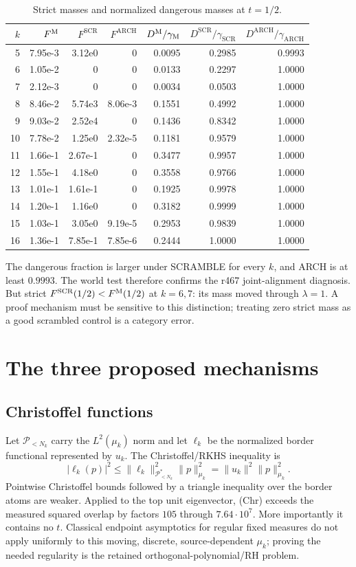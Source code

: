 \documentclass[11pt]{article}
\theoremstyle{remark}
\newcommand{\scr}{\mathrm{SCR}}
\newcommand{\arch}{\mathrm{ARCH}}
\begin{document}
\begin{table}[ht]
\centering\small
\caption{Strict masses and normalized dangerous masses at $t=1/2$.}
\label{tab:world}
\begin{tabular}{@{}rrrrrrr@{}}
\toprule
$k$&$F^{\rm M}$&$F^\scr$&$F^\arch$&
$D^{\rm M}/\gamma_{\rm M}$&$D^\scr/\gamma_\scr$&
$D^\arch/\gamma_\arch$\\
\midrule
5 &7.95e-3&3.12e0&0&0.0095&0.2985&0.9993\\
6 &1.05e-2&0&0&0.0133&0.2297&1.0000\\
7 &2.12e-3&0&0&0.0034&0.0503&1.0000\\
8 &8.46e-2&5.74e3&8.06e-3&0.1551&0.4992&1.0000\\
9 &9.03e-2&2.52e4&0&0.1436&0.8342&1.0000\\
10&7.78e-2&1.25e0&2.32e-5&0.1181&0.9579&1.0000\\
11&1.66e-1&2.67e-1&0&0.3477&0.9957&1.0000\\
12&1.55e-1&4.18e0&0&0.3558&0.9766&1.0000\\
13&1.01e-1&1.61e-1&0&0.1925&0.9978&1.0000\\
14&1.20e-1&1.16e0&0&0.3182&0.9999&1.0000\\
15&1.03e-1&3.05e0&9.19e-5&0.2953&0.9839&1.0000\\
16&1.36e-1&7.85e-1&7.85e-6&0.2444&1.0000&1.0000\\
\bottomrule
\end{tabular}
\end{table}

The dangerous fraction is larger under SCRAMBLE for every $k$, and
ARCH is at least $0.9993$.  The world test therefore confirms the r467
joint-alignment diagnosis.  But strict $F^\scr(1/2)<F^{\rm M}(1/2)$
at $k=6,7$: its mass moved through $\lambda=1$.  A proof mechanism
must be sensitive to this distinction; treating zero strict mass as a
good scrambled control is a category error.

\section{The three proposed mechanisms}

\subsection{Christoffel functions}

Let $\mathcal P_{<N_k}$ carry the $L^2(\mu_k)$ norm and let
$\ell_k$ be the normalized border functional represented by $u_k$.
The Christoffel/RKHS inequality is
\[
 |\ell_k(p)|^2\le\|\ell_k\|_{\mathcal P_{<N_k}^*}^2
 \|p\|_{\mu_k}^2=\|u_k\|^2\|p\|_{\mu_k}^2.
\tag{Chr}
\]
Pointwise Christoffel bounds followed by a triangle inequality over
the border atoms are weaker.  Applied to the top unit eigenvector,
(Chr) exceeds the measured squared overlap by factors
$105$ through $7.64\cdot10^7$.  More importantly it contains no $t$.
Classical endpoint asymptotics for regular fixed measures do not apply
uniformly to this moving, discrete, source-dependent $\mu_k$; proving
the needed regularity is the retained orthogonal-polynomial/RH problem.
\end{document}
